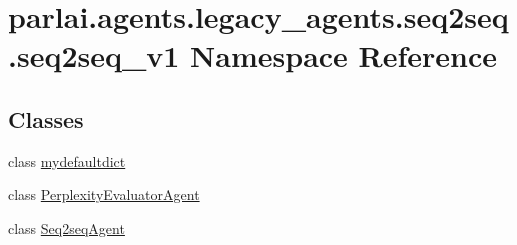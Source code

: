 \hypertarget{namespaceparlai_1_1agents_1_1legacy__agents_1_1seq2seq_1_1seq2seq__v1}{}\section{parlai.\+agents.\+legacy\+\_\+agents.\+seq2seq.\+seq2seq\+\_\+v1 Namespace Reference}
\label{namespaceparlai_1_1agents_1_1legacy__agents_1_1seq2seq_1_1seq2seq__v1}
\subsection*{Classes}
\begin{DoxyCompactItemize}
\item 
class \hyperlink{classparlai_1_1agents_1_1legacy__agents_1_1seq2seq_1_1seq2seq__v1_1_1mydefaultdict}{mydefaultdict}
\item 
class \hyperlink{classparlai_1_1agents_1_1legacy__agents_1_1seq2seq_1_1seq2seq__v1_1_1PerplexityEvaluatorAgent}{Perplexity\+Evaluator\+Agent}
\item 
class \hyperlink{classparlai_1_1agents_1_1legacy__agents_1_1seq2seq_1_1seq2seq__v1_1_1Seq2seqAgent}{Seq2seq\+Agent}
\end{DoxyCompactItemize}
